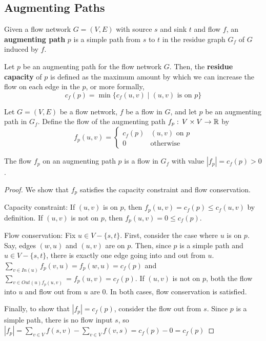 \subsection{Augmenting Paths}

\vspace{\parskip}

\begin{definition} 
    Given a flow network $G=(V,E)$ with source $s$ and sink $t$ and flow $f$, an \textbf{augmenting path} $p$ is a simple path from $s$ to $t$ in the residue graph $G_f$ of $G$ induced by $f$.
\end{definition}

\begin{definition}
    Let $p$ be an augmenting path for the flow network $G$. Then, the \textbf{residue capacity} of $p$ is defined as the maximum amount by which we can increase the flow on each edge in the $p$, or more formally,
    $$
    c_f(p) = \min \{c_f(u,v) \mid \text{$(u,v)$ is on $p$} \}
    $$
\end{definition}

\begin{definition}
    Let $G=(V,E)$ be a flow network, $f$ be a flow in $G$, and let $p$ be an augmenting path in $G_f$. Define the flow of the augmenting path $f_p:\, V \times V \to \mathbb{R}$ by
    $$
    f_p(u,v) = \begin{cases}
        c_f(p) & \text{$(u,v)$ on $p$} \\
        0 & \text{otherwise}
    \end{cases}
    $$
\end{definition}

\begin{lemma} \label{lem:augmenting-flow}
    The flow $f_p$ on an augmenting path $p$ is a flow in $G_f$ with value $|f_p| = c_f(p) > 0$.
\end{lemma}

\begin{proof}
    We show that $f_p$ satisfies the capacity constraint and flow conservation.

    Capacity constraint: If $(u,v)$ is on $p$, then $f_p(u,v)=c_f(p) \leq c_f(u,v)$ by definition. If $(u,v)$ is not on $p$, then $f_p(u,v) = 0 \leq c_f(p)$.

    Flow conservation: Fix $u \in V - \{s,t\}$. First, consider the case where $u$ is on $p$. Say, edges $(w,u)$ and $(u,v)$ are on $p$. Then, since $p$ is a simple path and $u \in V-\{s,t\}$, there is exactly one edge going into and out from $u$. $\sum_{v \in In(u)} f_p(v,u) = f_p(w,u) = c_f(p)$ and $\sum_{v \in Out(u) f_p(u,v)} = f_p(u,v) = c_f(p)$. If $(u,v)$ is not on $p$, both the flow into $u$ and flow out from $u$ are 0. In both cases, flow conservation is satisfied.

    Finally, to show that $|f_p| = c_f(p)$, consider the flow out from $s$. Since $p$ is a simple path, there is no flow input $s$, so $|f_p| = \sum_{v \in V} f(s,v) - \sum_{v \in V} f(v,s) = c_f(p) - 0 = c_f(p)$ 
\end{proof}

